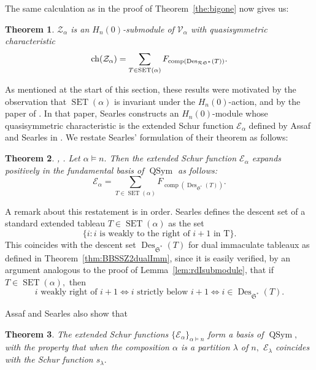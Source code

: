 \documentclass[12pt,letterpaper]{amsart}
\newtheorem{theorem}{Theorem}[section]
\theoremstyle{definition}
\DeclareMathOperator{\comp}{comp}
\newcommand{\dI}{\mathfrak{S}^*}
\newcommand{\rdI}{\mathcal{R}\mathfrak{S}^*}
\DeclareMathOperator{\QSym}{QSym}
\DeclareMathOperator{\Des}{Des}
\newcommand{\SET}{\ensuremath{\operatorname{SET}}} \newcommand{\NSET}{\ensuremath{\operatorname{NSET}}}\newcommand{\SRCT}{\ensuremath{\operatorname{SRCT}}}
\newcommand{\hn}{H_n(0)}
\begin{document}
The same calculation as in the proof of Theorem~\ref{the:bigone} now gives us:
\begin{theorem}\label{thm:rowstrictext-bigone} $\mathcal{Z_\alpha}$ is an $\hn$-submodule of $\mathcal{V}_\alpha$ with quasisymmetric characteristic 
\[\chr(\mathcal{Z_\alpha})=\sum_{T\in\SET(\alpha)} F_{\comp(\Des_{\rdI}(T))}.\]
\end{theorem}

As mentioned at the start of this section, these results were motivated by the observation that $\SET(\alpha)$ is invariant under the $\hn$-action, and by the paper of \cite{S2020}.  In that paper, Searles constructs an $\hn$-module whose quasisymmetric characteristic is the  extended Schur function $\mathcal{E}_\alpha$ defined by Assaf and Searles in \cite{AS2019}.  We restate Searles' formulation of their theorem as follows:

\begin{theorem}\label{thm:Assaf-Searles} \cite{AS2019}, \cite[Theorem 2.7]{S2020}.  Let $\alpha\vDash n.$ Then the extended Schur function 
$\mathcal{E}_\alpha$ expands positively in the fundamental basis of $\QSym$ as follows:
\begin{equation}\label{eq:ext-Schur} 
\mathcal{E}_\alpha= \sum_{T\in \SET(\alpha)} F_{\comp(\Des_{\dI}(T))}.
\end{equation}
\end{theorem}

A remark about this restatement is in order.  Searles defines the descent set of a standard extended tableau $T\in \SET(\alpha)$ as the set 
\[\{i : i \text{ is weakly to the right of $i+1$ in T}\}.\] 
This coincides with the descent set $\Des_{\dI}(T)$ for dual immaculate tableaux as defined in Theorem~\ref{thm:BBSSZ2dualImm}, since it is easily verified, by an argument analogous to the proof of Lemma~\ref{lem:rdIsubmodule}, that if $T\in \SET(\alpha),$ then 
\[  i  \text{ weakly  right of } i+1 \iff 
i \text{ strictly below } i+1 \iff i\in \Des_{\dI}(T).\]

Assaf and Searles also show that 
\begin{theorem}\label{thm:AS19}\cite{AS2019}  The extended Schur functions $\{\mathcal{E}_\alpha\}_{\alpha\vDash n}$ form a basis of $\QSym,$ with the property that when the composition $\alpha$  is a partition $\lambda$ of $n,$  $\mathcal{E}_\lambda$ coincides with the Schur function $s_\lambda.$
\end{theorem}
\end{document}
